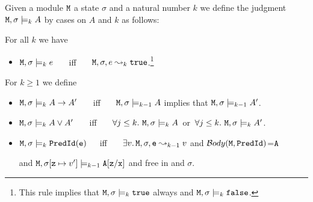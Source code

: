 \documentclass[acmsmall,screen]{acmart}
\begin{document}
 \begin{definition}
\label{def:assetion:step:index}
 Given a module ${\mbox{\tt{M}}}$ a state $\sigma$ and a natural number $k$ we define the judgment ${\mbox{\tt{M}}}, \sigma \models_k A$ by cases on $A$  and $k$  as follows:

\noindent
For all $k$ we have
\begin{itemize}
\item
\label{def:assrt:expr}
${\mbox{\tt{M}}}, \sigma \models_k e$ \ \ \  iff \ \ \   ${\mbox{\tt{M}}}, \sigma, e  \leadsto_{k} {\mbox{\tt{true}}}$.\footnote{This rule implies
that ${\mbox{\tt{M}}}, \sigma \models_k {\mbox{\tt{true}}}$  always and ${\mbox{\tt{M}}}, \sigma \models_k {\mbox{\tt{false}}}$.}
\end{itemize}

\noindent
For $k\geq 1$ we define
\begin{itemize}
\item
\label{def:assrt:impl}
${\mbox{\tt{M}}}, \sigma \models_k A \rightarrow A'$  \ \ \  iff \ \ \   ${\mbox{\tt{M}}}, \sigma \models_{k-1} A$ implies that ${\mbox{\tt{M}}}, \sigma \models_{k-1}   A'$. %
\item
\label{def:assrt:vee}
${\mbox{\tt{M}}}, \sigma \models_k A \vee A'$  \ \ \  iff \ \ \   $\forall j\leq k.\ {\mbox{\tt{M}}}, \sigma \models_{k}   A$\ or\   $\forall j\leq k.\ \M, \sigma \models_{k}   A'$. %
\item
\label{def:assrt:Pred}
${\mbox{\tt{M}}}, \sigma \models_k {{\mbox{\tt{PredId}}}({\mbox{\tt{e}}})}$\ \ \  iff \ \ \   $\exists v.\, {\mbox{\tt{M}}}, \sigma, {\mbox{\tt{e}}} \leadsto_{k-1} v$  and $\mathcal{B}ody({\mbox{\tt{M}}},{\mbox{\tt{{\mbox{\tt{PredId}}}}}})$=${\mbox{\tt{A}}}$ \\
 \strut \hspace{1.55in} and  ${\mbox{\tt{M}}}, \sigma[{\mbox{\tt{z}}}\mapsto v']  \models_{k-1} {\mbox{\tt{A}}}[{\mbox{\tt{z}}}/{\mbox{\tt{x}}}]  $ and    free in  and  $\sigma$.
\end{itemize}


\end{definition}
\end{document}
